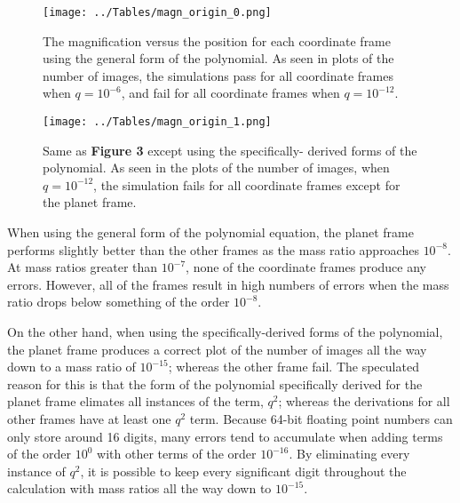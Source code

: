 \documentclass{article}
\begin{document}
\begin{figure}
	\texttt{[image: ../Tables/magn\_origin\_0.png]}
	\caption{The magnification versus the position for each coordinate
	frame using the general form of the polynomial. As seen in plots
	of the number of images, the simulations pass for all coordinate
	frames when $q=10^{-6}$, and fail for all coordinate frames when
	$q=10^{-12}$.}

	\vspace*{\floatsep}

	\texttt{[image: ../Tables/magn\_origin\_1.png]}
	\caption{Same as \textbf{Figure 3} except using the specifically-
	derived forms of the polynomial. As seen in the plots of the number
	of images, when $q=10^{-12}$, the simulation fails for all coordinate
	frames except for the planet frame.}
\end{figure}


When using the general form of the polynomial equation, the planet frame
performs slightly better than the other frames as the mass ratio approaches
$10^{-8}$. At mass ratios greater than $10^{-7}$, none of the coordinate
frames produce any errors. However, all of the frames result in high numbers
of errors when the mass ratio drops below something of the order $10^{-8}$.

On the other hand, when using the specifically-derived forms of the polynomial,
the planet frame produces a correct plot of the number of images all the way
down to a mass ratio of $10^{-15}$; whereas the other frame fail. The
speculated reason for this is that the form of the polynomial specifically
derived for the planet frame elimates all instances of the term, $q^{2}$;
whereas the derivations for all other frames have at least one $q^{2}$ term.
Because 64-bit floating point numbers can only store around 16 digits, many
errors tend to accumulate when adding terms of the order $10^{0}$ with other
terms of the order $10^{-16}$. By eliminating every instance of $q^{2}$,
it is possible to keep every significant digit throughout the calculation with
mass ratios all the way down to $10^{-15}$.
\end{document}
